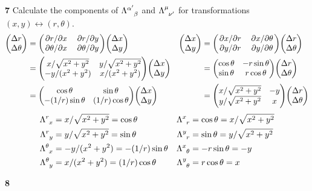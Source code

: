 \message{ !name(gr-ch5-notes.tex)}\documentclass[gr-notes.tex]{subfiles}
\begin{document}
\textbf{7}
Calculate the components of $\tensor{\Lambda}{^{\alpha'}_\beta}$ and $\tensor{\Lambda}{^\mu_{\nu'}}$ for transformations $(x, y) \leftrightarrow (r, \theta)$.
~
\begin{align*}
  \mqty( \Delta r \\ \Delta \theta ) &=
  \mqty( \pdv*{r}{x}      & \pdv*{r}{y} \\
         \pdv*{\theta}{x} & \pdv*{\theta}{y} )
  \mqty( \Delta x \\ \Delta y )
  &
  \mqty( \Delta x \\ \Delta y ) &=
  \mqty( \pdv*{x}{r} & \pdv*{x}{\theta} \\
         \pdv*{y}{r} & \pdv*{y}{\theta} )
  \mqty( \Delta r \\ \Delta \theta )
  \\ &=
  \mqty( x / \sqrt{x^2+y^2} & y / \sqrt{x^2 + y^2} \\
         -y / (x^2 + y^2) & x / (x^2 + y^2) )
  \mqty( \Delta x \\ \Delta y )
  &&=
  \mqty( \cos\theta & -r \sin\theta \\
         \sin\theta &  r \cos\theta )
  \mqty( \Delta r \\ \Delta \theta )
  \\ &=
  \mqty( \cos\theta & \sin\theta \\
         -(1/r) \sin\theta & (1/r) \cos\theta )
  \mqty( \Delta x \\ \Delta y )
  &&=
  \mqty( x / \sqrt{x^2 + y^2} & -y \\
         y / \sqrt{x^2 + y^2} &  x)
  \mqty( \Delta r \\ \Delta \theta )
\end{align*}
%
\begin{align*}
  \tensor{\Lambda}{^r_x} &= x / \sqrt{x^2 + y^2} = \cos\theta
  &
  \tensor{\Lambda}{^x_r} &= \cos\theta = x / \sqrt{x^2 + y^2}
  \\
  \tensor{\Lambda}{^r_y} &= y / \sqrt{x^2 + y^2} = \sin\theta
  &
  \tensor{\Lambda}{^y_r} &= \sin\theta = y / \sqrt{x^2 + y^2}
  \\
  \tensor{\Lambda}{^\theta_x} &= -y / (x^2 + y^2) = -(1/r) \sin\theta
  &
  \tensor{\Lambda}{^x_\theta} &= -r \sin\theta = -y
  \\
  \tensor{\Lambda}{^\theta_y} &= x / (x^2 + y^2) = (1/r) \cos\theta
  &
  \tensor{\Lambda}{^y_\theta} &= r \cos\theta = x
\end{align*}



\textbf{8}
\end{document}
